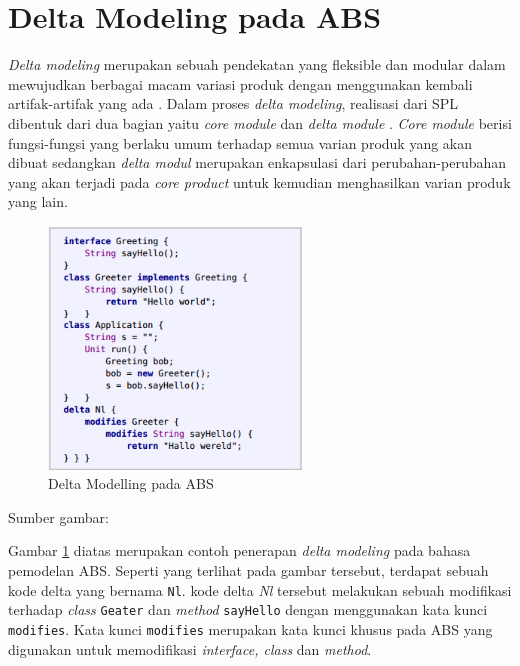 \section{Delta Modeling pada ABS}

\textit{Delta modeling} merupakan sebuah pendekatan yang fleksible dan modular dalam mewujudkan berbagai macam variasi produk dengan menggunakan kembali artifak-artifak yang ada \citep{hahnle2013hats}. Dalam proses \textit{delta modeling}, realisasi dari SPL dibentuk dari dua bagian yaitu \textit{core module} dan \textit{delta module} \cite{haber2011delta}. \textit{Core module} berisi fungsi-fungsi yang berlaku umum terhadap semua varian produk yang akan dibuat sedangkan \textit{delta modul} merupakan enkapsulasi dari perubahan-perubahan yang akan terjadi pada \textit{core product} untuk kemudian menghasilkan varian produk yang lain.\\

\begin{figure}
    \centering
    \includegraphics[width=0.6\textwidth]
        {img/delta-modeling-1.png}
    \caption{Delta Modelling pada ABS}
    \label{fig:clarkeDeltaExample}
\end{figure}
\vspace{-0.8cm}

\begin{center}
{\small Sumber gambar: \citep{clarke2012variability}}
\end{center}

Gambar \ref{fig:clarkeDeltaExample} diatas merupakan contoh penerapan \textit{delta modeling} pada bahasa pemodelan ABS. Seperti yang terlihat pada gambar tersebut, terdapat sebuah kode delta yang bernama \texttt{Nl}. kode delta \textit{Nl} tersebut melakukan sebuah modifikasi terhadap \textit{class} \texttt{Geater} dan \textit{method} \texttt{sayHello} dengan menggunakan kata kunci \texttt{modifies}. Kata kunci \texttt{modifies} merupakan kata kunci khusus pada ABS yang digunakan untuk memodifikasi \textit{interface, class} dan \textit{method}.\\

